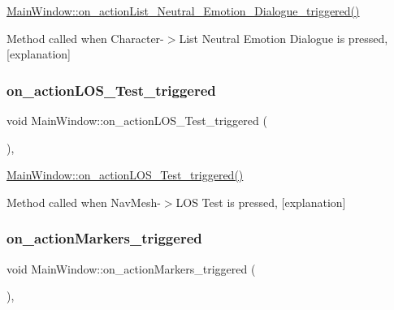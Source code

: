 \hyperlink{class_main_window_accb4e259115557925cc14c1ca6908812}{Main\+Window\+::on\+\_\+action\+List\+\_\+\+Neutral\+\_\+\+Emotion\+\_\+\+Dialogue\+\_\+triggered()} 

Method called when Character-\/$>$List Neutral Emotion Dialogue is pressed, \mbox{[}explanation\mbox{]} \mbox{\label{class_main_window_a5d11efcec7d4b4bcca2b9de7df348a1d}} 
\subsubsection{\texorpdfstring{on\+\_\+action\+L\+O\+S\+\_\+\+Test\+\_\+triggered}{on\_actionLOS\_Test\_triggered}}
{\footnotesize\ttfamily void Main\+Window\+::on\+\_\+action\+L\+O\+S\+\_\+\+Test\+\_\+triggered (\begin{DoxyParamCaption}{ }\end{DoxyParamCaption})\hspace{0.3cm}{\ttfamily [private]}, {\ttfamily [slot]}}



\hyperlink{class_main_window_a5d11efcec7d4b4bcca2b9de7df348a1d}{Main\+Window\+::on\+\_\+action\+L\+O\+S\+\_\+\+Test\+\_\+triggered()} 

Method called when Nav\+Mesh-\/$>$L\+OS Test is pressed, \mbox{[}explanation\mbox{]} \mbox{\label{class_main_window_addae5ed0b02101880ff1907c4b2c5864}} 
\subsubsection{\texorpdfstring{on\+\_\+action\+Markers\+\_\+triggered}{on\_actionMarkers\_triggered}}
{\footnotesize\ttfamily void Main\+Window\+::on\+\_\+action\+Markers\+\_\+triggered (\begin{DoxyParamCaption}{ }\end{DoxyParamCaption})\hspace{0.3cm}{\ttfamily [private]}, {\ttfamily [slot]}}



